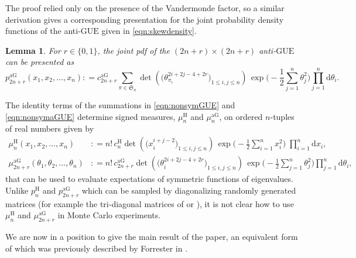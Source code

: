 \documentclass[pdftex, oneside, 10pt, letterpaper]{amsart}
\providecommand{\coloneqq}{\mathrel{\mathop:}=}
\theoremstyle{plain}
\newtheorem{lemma}{Lemma}
\theoremstyle{definition}
\theoremstyle{remark}
\begin{document}
The proof relied only on the presence of the Vandermonde factor, so a
similar derivation gives a corresponding presentation for the joint
probability density functions of the anti-{\ensuremath{\mathrm{GUE}}}{} given in
\eqref{eqn:skewdensity}.

\begin{lemma} For $r\in\{0,1\}$, the joint pdf of the
$(2n+r)\times(2n+r)$ anti-{\ensuremath{\mathrm{GUE}}}{} can be presented as
  \begin{equation}\label{eqn:nonsymaGUE}
    p_{2n+r}^{\mathrm{aG}}(x_1,x_2,\dotsc,x_n)\coloneqq{}
    c_{2n+r}^{\mathrm{aG}}\sum_{\pi\in\mathfrak{S}_n}
    {\det\left(\big(\theta_{\pi_i}^{2i+2j-4+2r}\big)_{1\leq i,j\leq n}\right)}
    \,\exp\big(-\frac{1}{2}\sum_{j=1}^n\theta_j^2\big)
    \prod_{j=1}^n\mathrm{d}\theta_i.
  \end{equation}
\end{lemma}

The identity terms of the summations in \eqref{eqn:nonsymGUE} and
\eqref{eqn:nonsymaGUE} determine signed measures,
$\mu_{n}^{\mathrm{H}}$ and $\mu_{n}^{\mathrm{aG}}$, on ordered
$n$-tuples of real numbers given by
\begin{align*}
  \mu_{n}^{\mathrm{H}}(x_1,x_2,\dotsc,x_n)&\coloneqq n!\,c_n^{\mathrm{H}}
  {\det\left(\big(x_{i}^{i+j-2}\big)_{1\leq i,j\leq n}\right)}
  \,\exp\Big(-\frac12\sum_{i=1}^n x_i^2\Big)
  {\;\prod_{i={1}}^{{n}} \mathrm{d}{{x}}_i},\\
    \mu_{2n+r}^{\mathrm{aG}}(\theta_1,\theta_2,\dotsc,\theta_n)&\coloneqq
    n!\,c_{2n+r}^{\mathrm{aG}}
    {\det\left(\big(\theta_{i}^{2i+2j-4+2r}\big)_{1\leq i,j\leq n}\right)}
    \,\exp\big(-\frac{1}{2}\sum_{j=1}^n\theta_j^2\big)
    \prod_{j=1}^n\mathrm{d}\theta_i,
\end{align*}
that can be used to evaluate expectations of symmetric functions of
eigenvalues.  Unlike $p_n^{\mathrm{H}}$ and $p_{2n+r}^{\mathrm{aG}}$
which can be sampled by diagonalizing randomly generated matrices (for
example the tri-diagonal matrices of \cite{DuEd} or \cite{Trotter}),
it is not clear how to use $\mu_{n}^{\mathrm{H}}$ and
$\mu_{2n+r}^{\mathrm{aG}}$ in Monte Carlo experiments.

\goodbreak

We are now in a position to give the main result of the paper, an
equivalent form of which was previously described by Forrester in
\cite[Eq.~(2.6)]{Forrester-Evenness}.  
\end{document}
